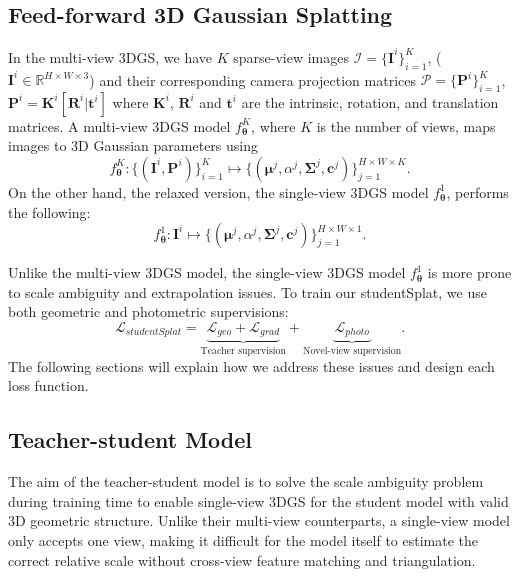 \documentclass{article} %
\begin{document}
\subsection{Feed-forward 3D Gaussian Splatting}

In the multi-view 3DGS, we have $K$ sparse-view images $\mathcal{I}=\{{\bm I}^{i}\}_{i=1}^K$, (${\bm I}^i \in \mathbb{R}^{H \times W \times 3}$) and their corresponding camera projection matrices $\mathcal{P}=\{{\bm P}^i \}_{i=1}^K$, ${\bm P}^i=\mathbf{K}^i[\mathbf{R}^i|\mathbf{t}^i]$ where $\mathbf{K}^i$, $\mathbf{R}^i$ and $\mathbf{t}^i$ are the intrinsic, rotation, and translation matrices.
A multi-view 3DGS model $f^{K}_{\bm \theta}$, where $K$ is the number of views, maps images to 3D Gaussian parameters using
\begin{equation}
    f^{K}_{\bm \theta}: \{ ({\bm I}^{i}, {\bm P}^i) \}_{i=1}^K \mapsto \{(\bm{\mu}^j, \alpha^j, \bm{\Sigma}^j, \bm{c}^j )\}^{H \times W \times K}_{j=1}.
\end{equation}
On the other hand, the relaxed version, the single-view 3DGS model $f^1_{\bm \theta}$, performs the following: 
\begin{equation}
    f^1_{\bm \theta}: {\bm I^i} \mapsto \{(\bm{\mu}^j, \alpha^j, \bm{\Sigma}^j, \bm{c}^j )\}^{H \times W \times 1}_{j=1}.
\end{equation}

Unlike the multi-view 3DGS model, the single-view 3DGS model $f^1_{\bm \theta}$ is more prone to scale ambiguity and extrapolation issues. To train our studentSplat, we use both geometric and photometric supervisions: 
\begin{equation}
\mathcal{L}_{studentSplat}=\underbrace{\mathcal{L}_{geo}+\mathcal{L}_{grad}}_{\text{Teacher supervision}}+\underbrace{\mathcal{L}_{photo}}_{\text{Novel-view supervision}}.
\end{equation}
The following sections will explain how we address these issues and design each loss function.

\subsection{Teacher-student Model}

The aim of the teacher-student model is to solve the scale ambiguity problem during training time to enable single-view 3DGS for the student model with valid 3D geometric structure. Unlike their multi-view counterparts, a single-view model only accepts one view, making it difficult for the model itself to estimate the correct relative scale without cross-view feature matching and triangulation. 
\end{document}
